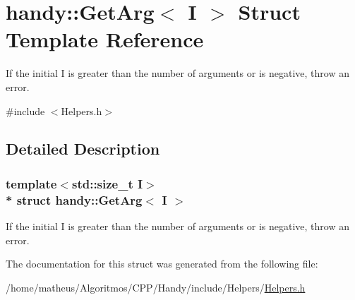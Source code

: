 \hypertarget{structhandy_1_1GetArg_3_01I_01_4}{}\section{handy\+:\+:Get\+Arg$<$ I $>$ Struct Template Reference}
\label{structhandy_1_1GetArg_3_01I_01_4}


If the initial {\ttfamily I} is greater than the number of arguments or is negative, throw an error.  




{\ttfamily \#include $<$Helpers.\+h$>$}



\subsection{Detailed Description}
\subsubsection*{template$<$std\+::size\+\_\+t I$>$\\*
struct handy\+::\+Get\+Arg$<$ I $>$}

If the initial {\ttfamily I} is greater than the number of arguments or is negative, throw an error. 

The documentation for this struct was generated from the following file\+:\begin{DoxyCompactItemize}
\item 
/home/matheus/\+Algoritmos/\+C\+P\+P/\+Handy/include/\+Helpers/\hyperlink{Helpers_2Helpers_8h}{Helpers.\+h}\end{DoxyCompactItemize}
